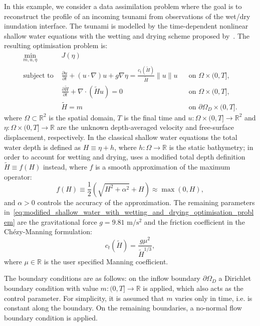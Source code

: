 \documentclass[prodmode,acmtoms]{acmsmall}
\begin{document}
In this example, we consider a data assimilation problem where the goal is to reconstruct 
the profile of an incoming tsunami from observations of the wet/dry inundation interface.
The tsunami is modelled by the time-dependent nonlinear shallow water equations with the wetting and drying scheme proposed by~.
The resulting optimisation problem is: 
\begin{equation}
\begin{aligned}
 \min_{m,u,\eta}~&J(\eta) \\
\mbox{subject to }&   \frac{\partial  u}{\partial t} + ( u \cdot \nabla)  u + g \nabla \eta = \frac{c_t(\tilde H)}{\tilde H} \| u\| u && \mbox{on } \Omega \times (0, T], \\
                  & \frac{\partial \tilde H}{\partial t} + \nabla \cdot  (\tilde H  u) = 0 && \mbox{on } \Omega \times (0, T], \\
& \tilde H = m && \mbox{on }  \partial \Omega_{D} \times (0, T]. 
\end{aligned}\label{eq:modified_shallow_water_with_wetting_and_drying_optimisation_problem}\end{equation} 
where $\Omega \subset \mathbb R^2$ is the spatial domain, $T$ is the final time and $u : \Omega \times (0, T] \to \mathbb R^2$ and $\eta  : \Omega \times (0, T] \to \mathbb R$ are the unknown depth-averaged velocity and free-surface displacement, respectively.
In the classical shallow water equations the total water depth is defined as $H \equiv \eta + h$, where $h :  \Omega \to \mathbb R$ is the static bathymetry; 
in order to account for wetting and drying,  uses a modified total depth definition $\tilde H \equiv f(H)$ instead, where $f$ is a smooth approximation of the maximum operator:
\begin{equation*}
f(H) \equiv \frac{1}{2} \left( \sqrt{H^2 + \alpha^2} + H \right) \approx \max(0, H), \label{eq:wd_function_f}
\end{equation*}
and $\alpha > 0$ controls the accuracy of the approximation.
The remaining parameters in~\eqref{eq:modified_shallow_water_with_wetting_and_drying_optimisation_problem} are the gravitational force $g = 9.81 \textrm{ m}/\textrm{s}^2$ and the friction coefficient in the Ch\'{e}zy-Manning formulation: 
\begin{equation*}
c_t(\tilde H) = \frac{g \mu ^ 2}{\tilde H^{1/3}},
\end{equation*}
where $\mu \in \mathbb R$ is the user specified Manning coefficient.

The boundary conditions are as follows: on the inflow boundary $\partial \Omega_D$ a Dirichlet boundary condition with value $m : (0, T] \to \mathbb R$ is applied, which also acts as the control parameter. 
For simplicity, it is assumed that $m$ varies only in time, i.e. is constant along the boundary. 
On the remaining boundaries, a no-normal flow boundary condition is applied.
\end{document}

